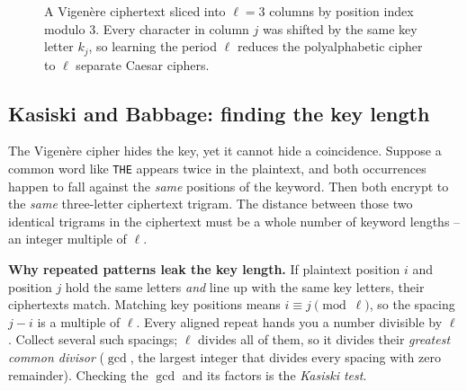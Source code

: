 \begin{figure}[htbp]
\caption{A Vigen\`ere ciphertext sliced into $\ell=3$ columns by position index modulo $3$. Every character in column $j$ was shifted by the same key letter $k_j$, so learning the period $\ell$ reduces the polyalphabetic cipher to $\ell$ separate Caesar ciphers.}
\label{ch02:fig-vig-columns}
\end{figure}

\subsection{Kasiski and Babbage: finding the key length}
\label{ch02:kasiski}

The Vigen\`ere cipher hides the key, yet it cannot hide a coincidence. Suppose a common word
like \texttt{THE} appears twice in the plaintext, and both occurrences happen to fall against
the \emph{same} positions of the keyword. Then both encrypt to the \emph{same} three-letter
ciphertext trigram. The distance between those two identical trigrams in the ciphertext must be
a whole number of keyword lengths -- an integer multiple of $\ell$.

\begin{whybox}
\textbf{Why repeated patterns leak the key length.} If plaintext position $i$ and position $j$
hold the same letters \emph{and} line up with the same key letters, their ciphertexts match.
Matching key positions means $i \equiv j \pmod{\ell}$, so the spacing $j-i$ is a multiple of
$\ell$. Every aligned repeat hands you a number divisible by $\ell$. Collect several such
spacings; $\ell$ divides all of them, so it divides their \emph{greatest common divisor} ($\gcd$,
the largest integer that divides every spacing with zero remainder). Checking the $\gcd$ and its
factors is the \emph{Kasiski test}.
\end{whybox}

